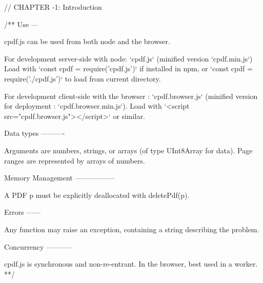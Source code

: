 // CHAPTER -1: Introduction

/**
Use
---

cpdf.js can be used from both node and the browser.

For development server-side with node: `cpdf.js` (minified version
`cpdf.min.js`) Load with `const cpdf = require('cpdf.js')` if installed in npm,
or `const cpdf = require('./cpdf.js')` to load from current directory.

For development client-side with the browser : `cpdf.browser.js` (minified
version for deployment : `cpdf.browser.min.js`). Load with `<script
src="cpdf.browser.js"></script>` or similar.


Data types
----------

Arguments are numbers, strings, or arrays (of type UInt8Array for data). Page
ranges are represented by arrays of numbers.


Memory Management
-----------------

A PDF p must be explicitly deallocated with deletePdf(p).


Errors
------

Any function may raise an exception, containing a string describing the problem. 


Concurrency
-----------

cpdf.js is synchronous and non-re-entrant. In the browser, best used in a worker.
**/

